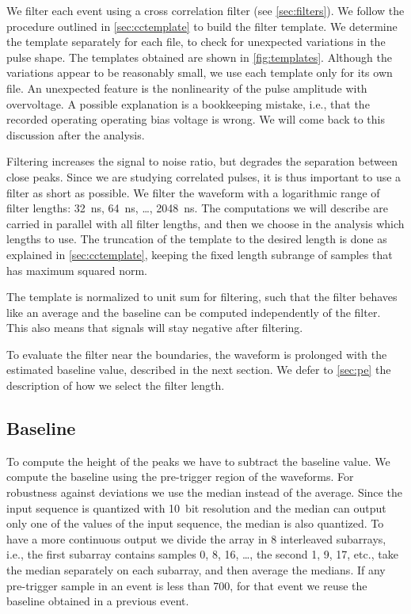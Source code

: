 \begin{figure}
    
    
    
\end{figure}

We filter each event using a cross correlation filter (see
\autoref{sec:filters}). We follow the procedure outlined in
\autoref{sec:cctemplate} to build the filter template. We determine the
template separately for each file, to check for unexpected variations in the
pulse shape. The templates obtained are shown in \autoref{fig:templates}.
Although the variations appear to be reasonably small, we use each template
only for its own file. An unexpected feature is the nonlinearity of the pulse
amplitude with overvoltage. A possible explanation is a bookkeeping mistake,
i.e., that the recorded operating operating bias voltage is wrong. We will come
back to this discussion after the analysis.

Filtering increases the signal to noise ratio, but degrades the separation
between close peaks. Since we are studying correlated pulses, it is thus
important to use a filter as short as possible. We filter the waveform with a
logarithmic range of filter lengths: \SI{32}{ns}, \SI{64}{ns}, \ldots,
\SI{2048}{ns}. The computations we will describe are carried in parallel with
all filter lengths, and then we choose in the analysis which lengths to use.
The truncation of the template to the desired length is done as explained in
\autoref{sec:cctemplate}, keeping the fixed length subrange of samples that has
maximum squared norm.

The template is normalized to unit sum for filtering, such that the
filter behaves like an average and the baseline can be computed independently
of the filter. This also means that signals will stay negative after filtering.

To evaluate the filter near the boundaries, the waveform is prolonged with the
estimated baseline value, described in the next section. We defer to
\autoref{sec:pe} the description of how we select the filter length.

\subsection{Baseline}

To compute the height of the peaks we have to subtract the baseline value. We
compute the baseline using the pre-trigger region of the waveforms. For
robustness against deviations we use the median instead of the average. Since
the input sequence is quantized with 10~bit resolution and the median can
output only one of the values of the input sequence, the median is also
quantized. To have a more continuous output we divide the array in 8
interleaved subarrays, i.e., the first subarray contains samples 0, 8, 16,
\dots, the second 1, 9, 17, etc., take the median separately on each subarray,
and then average the medians. If any pre-trigger sample in an event is less
than 700, for that event we reuse the baseline obtained in a previous event.

